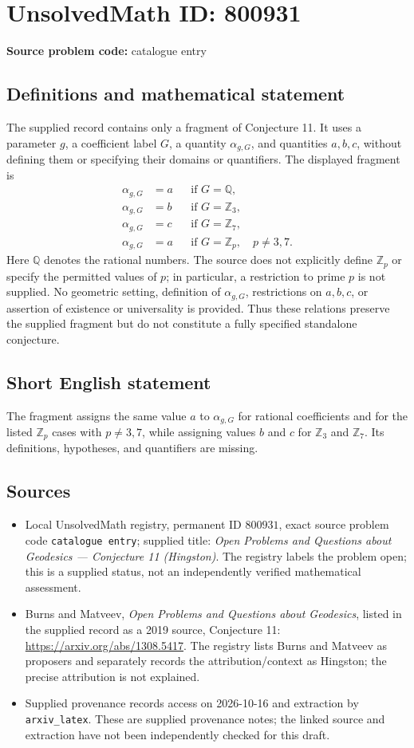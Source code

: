 \documentclass[11pt]{article}
\begin{document}
\section*{UnsolvedMath ID: 800931}
\textbf{Source problem code:} catalogue entry
\subsection{Definitions and mathematical statement}
The supplied record contains only a fragment of Conjecture 11. It uses a parameter \(g\), a coefficient label \(G\), a quantity \(\alpha_{g,G}\), and quantities \(a,b,c\), without defining them or specifying their domains or quantifiers. The displayed fragment is
\[
\begin{aligned}
\alpha_{g,G}&=a &&\text{if }G=\mathbb{Q},\\
\alpha_{g,G}&=b &&\text{if }G=\mathbb{Z}_{3},\\
\alpha_{g,G}&=c &&\text{if }G=\mathbb{Z}_{7},\\
\alpha_{g,G}&=a &&\text{if }G=\mathbb{Z}_{p},\quad p\neq 3,7.
\end{aligned}
\]
Here \(\mathbb{Q}\) denotes the rational numbers. The source does not explicitly define \(\mathbb{Z}_{p}\) or specify the permitted values of \(p\); in particular, a restriction to prime \(p\) is not supplied. No geometric setting, definition of \(\alpha_{g,G}\), restrictions on \(a,b,c\), or assertion of existence or universality is provided. Thus these relations preserve the supplied fragment but do not constitute a fully specified standalone conjecture.
\subsection{Short English statement}
The fragment assigns the same value \(a\) to \(\alpha_{g,G}\) for rational coefficients and for the listed \(\mathbb{Z}_{p}\) cases with \(p\neq 3,7\), while assigning values \(b\) and \(c\) for \(\mathbb{Z}_{3}\) and \(\mathbb{Z}_{7}\). Its definitions, hypotheses, and quantifiers are missing.
\subsection{Sources}
\begin{itemize}
\item Local UnsolvedMath registry, permanent ID \(800931\), exact source problem code \texttt{catalogue entry}; supplied title: \emph{Open Problems and Questions about Geodesics --- Conjecture 11 (Hingston)}. The registry labels the problem open; this is a supplied status, not an independently verified mathematical assessment.
\item Burns and Matveev, \emph{Open Problems and Questions about Geodesics}, listed in the supplied record as a 2019 source, Conjecture 11: \url{https://arxiv.org/abs/1308.5417}. The registry lists Burns and Matveev as proposers and separately records the attribution/context as Hingston; the precise attribution is not explained.
\item Supplied provenance records access on 2026-10-16 and extraction by \texttt{arxiv\_latex}. These are supplied provenance notes; the linked source and extraction have not been independently checked for this draft.
\end{itemize}
\end{document}
